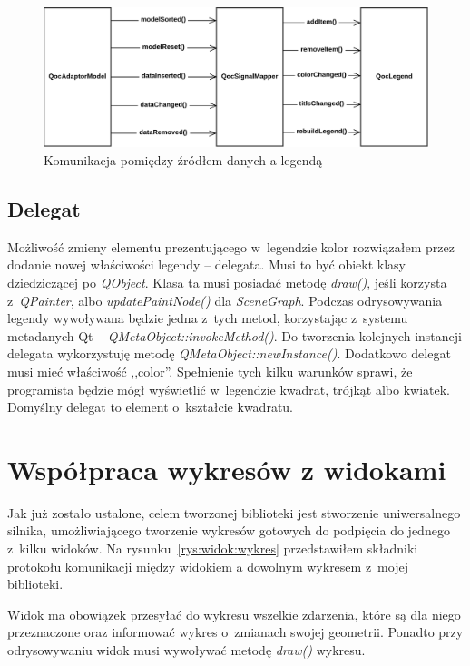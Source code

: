 \begin{figure}[H]
\centering
\includegraphics[scale=0.7]{img/legenda.pdf}
\caption{Komunikacja pomiędzy źródłem danych a legendą}\label{rys:diag:legenda}
\end{figure}

\subsection{Delegat}
Możliwość zmieny elementu prezentującego w~legendzie kolor rozwiązałem przez dodanie nowej właściwości legendy -- delegata. Musi to być obiekt klasy dziedziczącej po \textit{QObject}. Klasa ta musi posiadać metodę \textit{draw()}, jeśli korzysta z~\textit{QPainter}, albo \textit{updatePaintNode()} dla \textit{SceneGraph}. Podczas odrysowywania legendy wywoływana będzie jedna z~tych metod, korzystając z~systemu metadanych Qt -- \textit{QMetaObject::invokeMethod()}. Do tworzenia kolejnych instancji delegata wykorzystuję metodę \textit{QMetaObject::newInstance()}.  Dodatkowo delegat musi mieć właściwość ,,color''. Spełnienie tych kilku warunków sprawi, że programista będzie mógł wyświetlić w~legendzie kwadrat, trójkąt albo kwiatek. Domyślny delegat to element o~kształcie kwadratu.

\section{Współpraca wykresów z widokami }
Jak już zostało ustalone, celem tworzonej biblioteki jest stworzenie uniwersalnego silnika, umożliwiającego tworzenie wykresów gotowych do podpięcia do jednego z~kilku widoków. Na rysunku~\ref{rys:widok:wykres} przedstawiłem składniki protokołu komunikacji między widokiem a dowolnym wykresem z~mojej biblioteki.

Widok ma obowiązek przesyłać do wykresu wszelkie zdarzenia, które są dla niego przeznaczone oraz informować wykres o~zmianach swojej geometrii. Ponadto przy odrysowywaniu widok musi wywoływać metodę \textit{draw()} wykresu.

